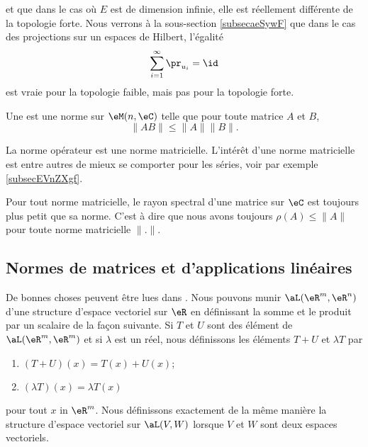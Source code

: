 et que dans le cas où \( E\) est de dimension infinie, elle est réellement différente de la topologie forte. Nous verrons à la sous-section \ref{subsecaeSywF} que dans le cas des projections sur un espaces de Hilbert, l'égalité
\begin{equation}
    \sum_{i=1}^{\infty}\pr_{u_i}=\id
\end{equation}
est vraie pour la topologie faible, mais pas pour la topologie forte.

\begin{definition}  \label{DefJWRWQue}
    Une  est une norme sur \( \eM(n,\eC)\) telle que pour toute matrice \( A\) et \( B\), 
    \begin{equation}
        \| AB \|\leq \| A \|\| B \|.
    \end{equation}
\end{definition}
La norme opérateur est une norme matricielle. L'intérêt d'une norme matricielle est entre autres de mieux se comporter pour les séries, voir par exemple \ref{subsecEVnZXgf}.

\begin{proposition}
    Pour tout norme matricielle, le rayon spectral d'une matrice sur \( \eC\) est toujours plus petit que sa norme. C'est à dire que nous avons toujours \( \rho(A)\leq \| A \|\) pour toute norme matricielle \( \| . \|\).
\end{proposition}

\subsection{Normes de matrices et d'applications linéaires}
\label{subsecNomrApplLin}

De bonnes choses peuvent être lues dans \cite{BrunelleMatricielle}. Nous pouvons munir $\aL(\eR^m, \eR^n)$ d'une structure d'espace vectoriel sur $\eR$ en définissant la somme et le produit par un scalaire de la façon suivante. Si $T$ et $U$ sont des élément de $\aL(\eR^m,\eR^m)$ et si $\lambda$ est un réel, nous définissons les éléments $T+U$ et $\lambda T$ par
\begin{enumerate}
	\item
		$(T+U)(x)=T(x)+U(x)$;
	\item
		$(\lambda T)(x)=\lambda T(x)$
\end{enumerate}
pour tout $x$ in $\eR^m$. Nous définissons exactement de la même manière la structure d'espace vectoriel sur $\aL(V,W)$ lorsque $V$ et $W$ sont deux espaces vectoriels. 

